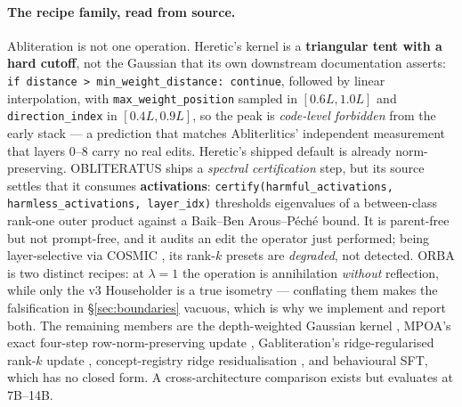 \documentclass[11pt,letterpaper]{article}
\begin{document}
\paragraph{The recipe family, read from source.} Abliteration is not one operation. Heretic's kernel is a \textbf{triangular tent with a hard cutoff}, not the Gaussian that its own downstream documentation asserts: \texttt{if distance > min\_weight\_distance: continue}, followed by linear interpolation, with \texttt{max\_weight\_position} sampled in $[0.6L, 1.0L]$ and \texttt{direction\_index} in $[0.4L, 0.9L]$, so the peak is \emph{code-level forbidden} from the early stack \citep{Weidmann2026} --- a prediction that matches Abliterlitics' independent measurement that layers 0--8 carry no real edits. Heretic's shipped default is already norm-preserving. OBLITERATUS \citep{Obliteratus2026} ships a \emph{spectral certification} step, but its source settles that it consumes \textbf{activations}: \texttt{certify(harmful\_activations, harmless\_activations, layer\_idx)} thresholds eigenvalues of a between-class rank-one outer product against a Baik--Ben Arous--P\'ech\'e bound. It is parent-free but not prompt-free, and it audits an edit the operator just performed; being layer-selective via COSMIC \citep{Siu2025}, its rank-$k$ presets are \emph{degraded}, not detected. ORBA \citep{Lai2026} is two distinct recipes: at $\lambda = 1$ the operation is annihilation \emph{without} reflection, while only the v3 Householder is a true isometry --- conflating them makes the falsification in \S\ref{sec:boundaries} vacuous, which is why we implement and report both. The remaining members are the depth-weighted Gaussian kernel \citep{Labonne2024}, MPOA's exact four-step row-norm-preserving update \citep{Lai2025}, Gabliteration's ridge-regularised rank-$k$ update \citep{Guelmez2026}, concept-registry ridge residualisation \citep{Cristofano2026}, and behavioural SFT, which has no closed form. A cross-architecture comparison exists \citep{Young2025} but evaluates at 7B--14B.
\end{document}

